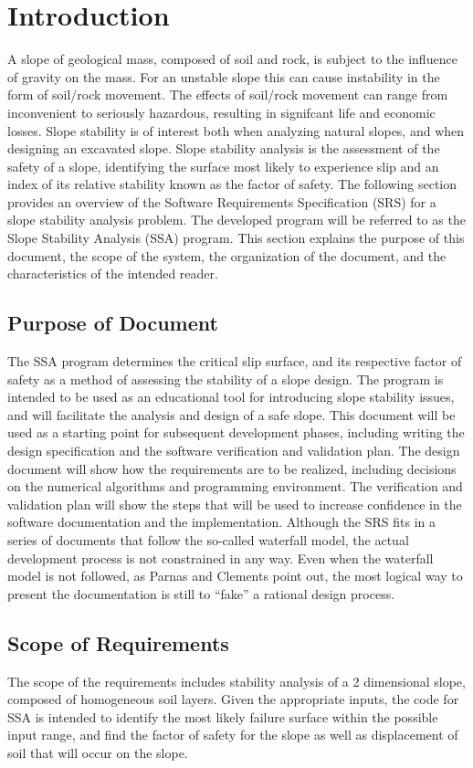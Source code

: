 \documentclass[12pt]{article}
\begin{document}
\section{Introduction}
\label{Sec:Intro}
A slope of geological mass, composed of soil and rock, is subject to the influence of gravity on the mass. For an unstable slope this can cause instability in the form of soil/rock movement. The effects of soil/rock movement can range from inconvenient to seriously hazardous, resulting in signifcant life and economic losses. Slope stability is of interest both when analyzing natural slopes, and when designing an excavated slope. Slope stability analysis is the assessment of the safety of a slope, identifying the surface most likely to experience slip and an index of its relative stability known as the factor of safety.
The following section provides an overview of the Software Requirements Specification (SRS) for a slope stability analysis problem. The developed program will be referred to as the Slope Stability Analysis (SSA) program. This section explains the purpose of this document, the scope of the system, the organization of the document, and the characteristics of the intended reader.
\subsection{Purpose of Document}
\label{Sec:DocPurpose}
The SSA program determines the critical slip surface, and its respective factor of safety as a method of assessing the stability of a slope design. The program is intended to be used as an educational tool for introducing slope stability issues, and will facilitate the analysis and design of a safe slope.
This document will be used as a starting point for subsequent development phases, including writing the design specification and the software verification and validation plan. The design document will show how the requirements are to be realized, including decisions on the numerical algorithms and programming environment. The verification and validation plan will show the steps that will be used to increase confidence in the software documentation and the implementation. Although the SRS fits in a series of documents that follow the so-called waterfall model, the actual development process is not constrained in any way. Even when the waterfall model is not followed, as Parnas and Clements point out, the most logical way to present the documentation is still to ``fake'' a rational design process.
\subsection{Scope of Requirements}
\label{Sec:ReqsScope}
The scope of the requirements includes stability analysis of a 2 dimensional slope, composed of homogeneous soil layers. Given the appropriate inputs, the code for SSA is intended to identify the most likely failure surface within the possible input range, and find the factor of safety for the slope as well as displacement of soil that will occur on the slope.
\end{document}
